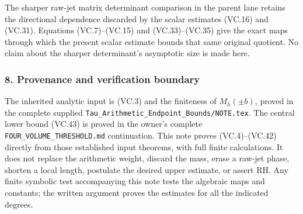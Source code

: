 The sharper raw-jet matrix determinant comparison in the parent lane retains the directional dependence discarded by the scalar estimates (VC.16) and (VC.31). Equations (VC.7)--(VC.15) and (VC.33)--(VC.35) give the exact maps through which the present scalar estimate bounds that same original quotient. No claim about the sharper determinant's asymptotic size is made here.

\subsubsection{8. Provenance and verification boundary}\label{endpoint-volume_connection_original--provenance-and-verification-boundary}

The inherited analytic input is (VC.3) and the finiteness of \(M_h(\pm b)\), proved in the complete supplied \nolinkurl{Tau_Arithmetic_Endpoint_Bounds/NOTE.tex}. The central lower bound (VC.43) is proved in the owner's complete \nolinkurl{FOUR_VOLUME_THRESHOLD.md} continuation. This note proves (VC.4)--(VC.42) directly from those established input theorems, with full finite calculations. It does not replace the arithmetic weight, discard the mass, erase a raw-jet phase, shorten a local length, postulate the desired upper estimate, or assert RH. Any finite symbolic test accompanying this note tests the algebraic maps and constants; the written argument proves the estimates for all the indicated degrees.
